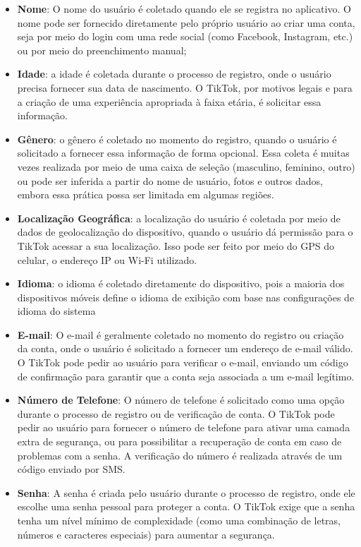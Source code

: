 \begin{itemize}
    \item \textbf{Nome}: O nome do usuário é coletado quando ele se registra no aplicativo. O nome pode ser fornecido diretamente pelo próprio usuário ao criar uma conta, seja por meio do login com uma rede social (como Facebook, Instagram, etc.) ou por meio do preenchimento manual;
    \item \textbf{Idade}: a idade é coletada durante o processo de registro, onde o usuário precisa fornecer sua data de nascimento. O TikTok, por motivos legais e para a criação de uma experiência apropriada à faixa etária, é solicitar essa informação.
    \item \textbf{Gênero}: o gênero é coletado no momento do registro, quando o usuário é solicitado a fornecer essa informação de forma opcional. Essa coleta é muitas vezes realizada por meio de uma caixa de seleção (masculino, feminino, outro) ou pode ser inferida a partir do nome de usuário, fotos e outros dados, embora essa prática possa ser limitada em algumas regiões.
    \item \textbf{Localização Geográfica}: a localização do usuário é coletada por meio de dados de geolocalização do dispositivo, quando o usuário dá permissão para o TikTok acessar a sua localização. Isso pode ser feito por meio do GPS do celular, o endereço IP ou Wi-Fi utilizado.
    \item \textbf{Idioma}: o idioma é coletado diretamente do dispositivo, pois a maioria dos dispositivos móveis define o idioma de exibição com base nas configurações de idioma do sistema
    \item \textbf{E-mail}: O e-mail é geralmente coletado no momento do registro ou criação da conta, onde o usuário é solicitado a fornecer um endereço de e-mail válido. O TikTok pode pedir ao usuário para verificar o e-mail, enviando um código de confirmação para garantir que a conta seja associada a um e-mail legítimo.
    \item \textbf{Número de Telefone}: O número de telefone é solicitado como uma opção durante o processo de registro ou de verificação de conta. O TikTok pode pedir ao usuário para fornecer o número de telefone para ativar uma camada extra de segurança, ou para possibilitar a recuperação de conta em caso de problemas com a senha. A verificação do número é realizada através de um código enviado por SMS.
    \item \textbf{Senha}: A senha é criada pelo usuário durante o processo de registro, onde ele escolhe uma senha pessoal para proteger a conta. O TikTok exige que a senha tenha um nível mínimo de complexidade (como uma combinação de letras, números e caracteres especiais) para aumentar a segurança.
\end{itemize}



